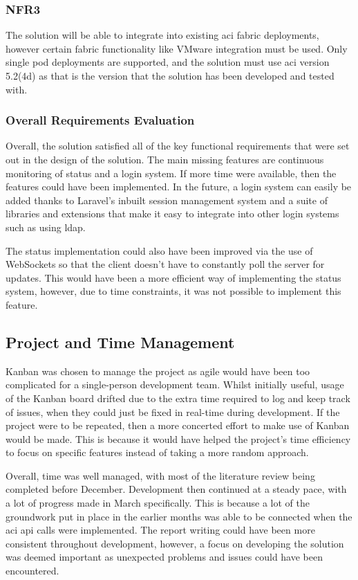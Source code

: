 \subsubsection{NFR3}
The solution will be able to integrate into existing \gls{aci} fabric deployments, however certain fabric functionality like VMware integration must be used. Only single pod deployments are supported, and the solution must use \gls{aci} version 5.2(4d) as that is the version that the solution has been developed and tested with.

\subsubsection{Overall Requirements Evaluation}
Overall, the solution satisfied all of the key functional requirements that were set out in the design of the solution. The main missing features are continuous monitoring of status and a login system. If more time were available, then the features could have been implemented. In the future, a login system can easily be added thanks to Laravel's inbuilt session management system and a suite of libraries and extensions that make it easy to integrate into other login systems such as using \gls{ldap}.

The status implementation could also have been improved via the use of WebSockets so that the client doesn't have to constantly poll the server for updates. This would have been a more efficient way of implementing the status system, however, due to time constraints, it was not possible to implement this feature.

\subsection{Project and Time Management}
Kanban was chosen to manage the project as agile would have been too complicated for a single-person development team. Whilst initially useful, usage of the Kanban board drifted due to the extra time required to log and keep track of issues, when they could just be fixed in real-time during development. If the project were to be repeated, then a more concerted effort to make use of Kanban would be made. This is because it would have helped the project's time efficiency to focus on specific features instead of taking a more random approach.

Overall, time was well managed, with most of the literature review being completed before December. Development then continued at a steady pace, with a lot of progress made in March specifically. This is because a lot of the groundwork put in place in the earlier months was able to be connected when the \gls{aci} \gls{api} calls were implemented. The report writing could have been more consistent throughout development, however, a focus on developing the solution was deemed important as unexpected problems and issues could have been encountered.
